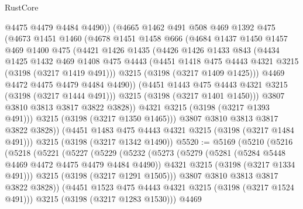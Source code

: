 \begin{lexlean}{RustCore}
\begin{coremodule}
              @4475
              @4479
              @4484
              @4490))
          (@4665
            @1462
            @491
            @508
            @469
            @1392
            @475
            (@4673
              @1451
              @1460
              (@4678
                @1451
                @1458
                @666
                (@4684
                  @1437
                  @1450
                  @1457
                  @469
                  @1400
                  @475
                  (@4421
                    @1426
                    @1435
                    (@4426
                      @1426
                      @1433
                      @843
                      (@4434
                        @1425
                        @1432
                        @469
                        @1408
                        @475
                        @4443
                        (@4451 @1418 @475 @4443 @4321 @3215 (@3198 (@3217 @1419 @491)))
                        @3215
                        (@3198 (@3217 @1409 @1425)))
                      @4469
                      @4472
                      @4475
                      @4479
                      @4484
                      @4490))
                  (@4451 @1443 @475 @4443 @4321 @3215 (@3198 (@3217 @1444 @491)))
                  @3215
                  (@3198 (@3217 @1401 @1450)))
                @3807
                @3810
                @3813
                @3817
                @3822
                @3828))
            @4321
            @3215
            (@3198 (@3217 @1393 @491)))
          @3215
          (@3198 (@3217 @1350 @1465)))
        @3807
        @3810
        @3813
        @3817
        @3822
        @3828))
    (@4451 @1483 @475 @4443 @4321 @3215 (@3198 (@3217 @1484 @491)))
    @3215
    (@3198 (@3217 @1342 @1490))
@5520 := @5169
    (@5210
      (@5216
        (@5218
          (@5221
            (@5227
              (@5229
                (@5232
                  (@5273
                    (@5279
                      (@5281 (@5284 @5448 @4469 @4472 @4475 @4479 @4484 @4490))
                      @4321
                      @3215
                      (@3198 (@3217 @1334 @491)))
                    @3215
                    (@3198 (@3217 @1291 @1505)))
                  @3807
                  @3810
                  @3813
                  @3817
                  @3822
                  @3828))
              (@4451 @1523 @475 @4443 @4321 @3215 (@3198 (@3217 @1524 @491)))
              @3215
              (@3198 (@3217 @1283 @1530)))
            @4469

\end{coremodule}
\end{lexlean}
